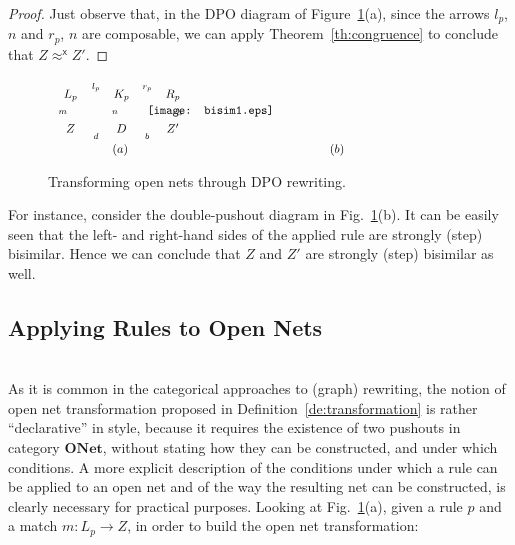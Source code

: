 \documentclass{LMCS}
\newcommand{\onet}{\ensuremath{\mathbf{ONet}}}
\begin{document}
\begin{proof}Just observe that, in the DPO diagram 
  of Figure~\ref{fi:open-dpo}(a),
since the arrows $l_p$, $n$ and $r_p$, $n$ are composable, we can apply
  Theorem~\ref{th:congruence} to conclude that $Z \approx^{\mathsf{x}}
  Z'$.
\end{proof}


\begin{figure}[t]
  \[
  \begin{array}{cc}
    \vcenter{
      \xymatrix@R=5mm{
        L_p \ar[d]_m & K_p \ar@{.>}[d]_n \ar[l]_{l_p} \ar[r]^{r_p} &
        R_p \ar@{.>}[d]^h \\
        Z & D \ar@{.>}[l]^d \ar@{.>}[r]_b & Z'
      }
    }
& \hspace{-20mm}
    \vcenter{
      \texttt{[image: bisim1.eps]}
    }
    \\
    (a) & (b)\ \ \ \ \ \ \ \ \ \ \ \ \ \ \ \ \
  \end{array}
  \]
\caption{Transforming open nets through DPO rewriting.}
\label{fi:open-dpo}
\end{figure}


For instance, consider the double-pushout diagram in
Fig.~\ref{fi:open-dpo}(b).  It can be easily seen that the left- and
right-hand sides of the applied rule are strongly (step) bisimilar.
Hence we can conclude that $Z$ and $Z'$ are strongly (step) bisimilar
as well.


\subsection{Applying Rules to Open Nets}
\ \\

\noindent
As it is common in the categorical approaches to (graph) rewriting,
the notion of open net transformation proposed in
Definition~\ref{de:transformation} is rather ``declarative'' in style,
because it requires the existence of two pushouts in category $\onet$,
without stating how they can be constructed, and under which
conditions.  A more explicit description of the conditions under which
a rule can be applied to an open net and of the way the resulting net
can be constructed, is clearly necessary for practical purposes.
Looking at Fig.~\ref{fi:open-dpo}(a), 
given a rule $p$ and a match $m : L_p \to Z$, in order to
build the open net transformation:
\end{document}
